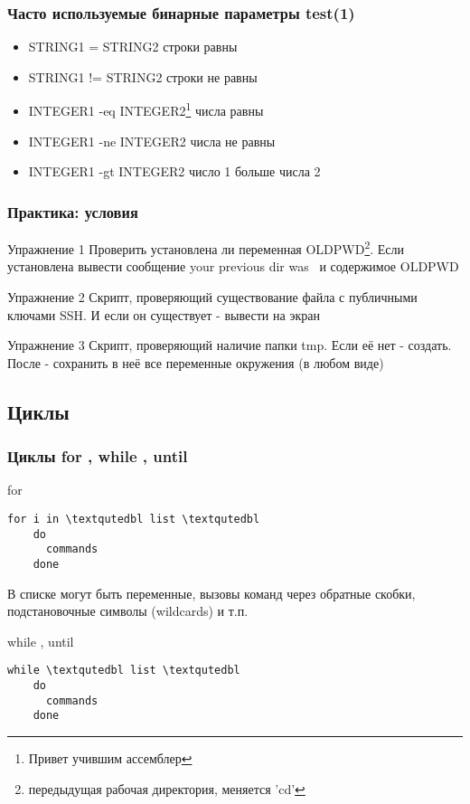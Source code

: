 \begin{frame}[fragile]
  \frametitle{Часто используемые бинарные параметры test(1)}
  \begin{itemize}
    \item \alert{STRING1 = STRING2} строки равны
    \item \alert{STRING1 != STRING2} строки не равны
    \item \alert{INTEGER1 -eq INTEGER2}\footnote{Привет учившим ассемблер} числа равны
    \item \alert{INTEGER1 -ne INTEGER2} числа не равны
    \item \alert{INTEGER1 -gt INTEGER2} число 1 больше числа 2
  \end{itemize}
\end{frame}

\begin{frame}[fragile]
  \frametitle{Практика: условия}

  \alert{Упражнение 1} Проверить установлена ли переменная OLDPWD\footnote{передыдущая рабочая директория, меняется 'cd'}. Если установлена вывести сообщение \textqutedbl your previous dir was \textqutedbl\  и содержимое OLDPWD \pause

  \alert{Упражнение 2} Скрипт, проверяющий существование файла с публичными ключами SSH. И если он существует - вывести на экран  \pause

  \alert{Упражнение 3} Скрипт, проверяющий наличие папки tmp. Если её нет - создать. После - сохранить в неё все переменные окружения (в любом виде)
\end{frame}

\subsection{Циклы}

\begin{frame}[fragile]
  \frametitle{Циклы \textqutedbl for \textqutedbl , \textqutedbl while \textqutedbl , \textqutedbl until \textqutedbl}
      \alert{for}
\begin{lstlisting}[basicstyle=\normalsize]
	for i in \textqutedbl list \textqutedbl
	do
	  commands
	done
\end{lstlisting}
      В списке могут быть переменные, вызовы команд через обратные скобки, подстановочные символы (wildcards) и т.п.\pause
  
      \alert{while , until}
\begin{lstlisting}[basicstyle=\normalsize]
	while \textqutedbl list \textqutedbl
	do
	  commands
	done
\end{lstlisting} 
\end{frame}

